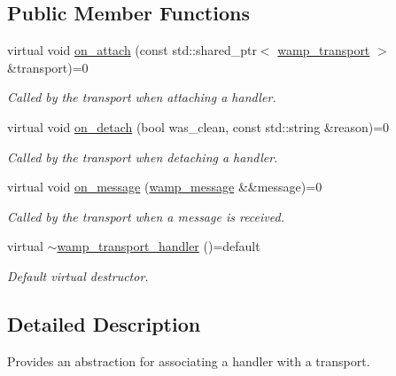 \subsection*{Public Member Functions}
\begin{DoxyCompactItemize}
\item 
virtual void \hyperlink{classautobahn_1_1wamp__transport__handler_ad931e9199fd0f138db0a21bebeafac96}{on\+\_\+attach} (const std\+::shared\+\_\+ptr$<$ \hyperlink{classautobahn_1_1wamp__transport}{wamp\+\_\+transport} $>$ \&transport)=0
\begin{DoxyCompactList}\small\item\em Called by the transport when attaching a handler. \end{DoxyCompactList}\item 
virtual void \hyperlink{classautobahn_1_1wamp__transport__handler_aa42e0c0bfdfca5b35d0c249539f8deea}{on\+\_\+detach} (bool was\+\_\+clean, const std\+::string \&reason)=0
\begin{DoxyCompactList}\small\item\em Called by the transport when detaching a handler. \end{DoxyCompactList}\item 
virtual void \hyperlink{classautobahn_1_1wamp__transport__handler_ad7e506952de0a3c5b86d4d17a2baa2b5}{on\+\_\+message} (\hyperlink{classautobahn_1_1wamp__message}{wamp\+\_\+message} \&\&message)=0
\begin{DoxyCompactList}\small\item\em Called by the transport when a message is received. \end{DoxyCompactList}\item 
virtual \hyperlink{classautobahn_1_1wamp__transport__handler_aa98540474a0fa1d79012d73fd1b74a7a}{$\sim$wamp\+\_\+transport\+\_\+handler} ()=default\hypertarget{classautobahn_1_1wamp__transport__handler_aa98540474a0fa1d79012d73fd1b74a7a}{}\label{classautobahn_1_1wamp__transport__handler_aa98540474a0fa1d79012d73fd1b74a7a}

\begin{DoxyCompactList}\small\item\em Default virtual destructor. \end{DoxyCompactList}\end{DoxyCompactItemize}


\subsection{Detailed Description}
Provides an abstraction for associating a handler with a transport. 

